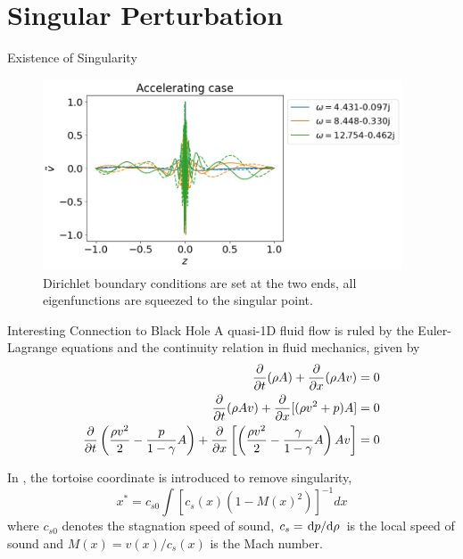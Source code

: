 \section{Singular Perturbation}
\begin{frame}{Existence of Singularity}
  \begin{figure}[htbp]
  \begin{center}
    \includegraphics[width=0.95\textwidth]{figures/results-bad-accelerating-v.png}
  \end{center}
  \caption{Dirichlet boundary conditions are set at the two ends, all eigenfunctions are squeezed to the singular point.}
  \label{fig:bad-accelerating-v}
\end{figure}


\end{frame}

\begin{frame}{Interesting Connection to Black Hole}
  A quasi-1D fluid flow is ruled by the Euler-Lagrange equations and the continuity relation in fluid mechanics, given by \cite{da_rocha_black_2017}
\begin{align} \label{eq:euler-lagrange}
  \pdv{t}(\rho A) + \pdv{x}(\rho A v) &= 0 \\
  \pdv{t}(\rho A v) + \pdv{x}[(\rho v^2 + p)A] &= 0 \\
  \pdv{t}\left(\frac{\rho v^2}{2} - \frac{p}{1-\gamma}A\right) +
  \pdv{x}\left[ \left(\frac{\rho v^2}{2} - \frac{\gamma}{1-\gamma}A\right)Av \right] &= 0
\end{align}

In \cite{da_rocha_black_2017, furuhashi_simulation_2006}, the tortoise coordinate is introduced to remove singularity,
\[ x^* = c_{s0}\int [c_s(x)(1-M(x)^2)]^{-1} dx \]
where $c_{s0}$ denotes the stagnation speed of sound, $c_s = \dv*{p}{\rho}$ is the local speed of sound and $M(x)= v(x)/c_s(x)$ is the Mach number.
\end{frame}

